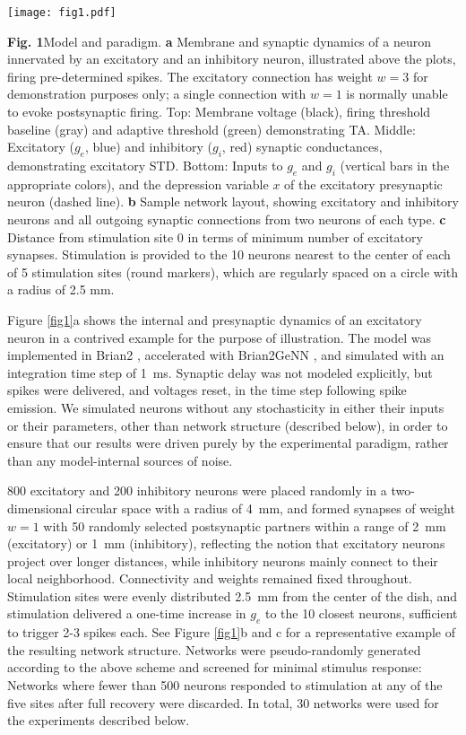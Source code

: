 \documentclass[pdflatex,referee,iicol,sn-basic]{sn-jnl}
\theoremstyle{thmstyleone}%
\theoremstyle{thmstyletwo}%
\theoremstyle{thmstylethree}%
\begin{document}
\begin{figure*}%
    \centering
    \texttt{[image: fig1.pdf]}
    \caption{}
    \label{fig1}
\end{figure*}
\textbf{Fig. 1}Model and paradigm. \textbf{a} Membrane and synaptic dynamics of a neuron innervated by an excitatory and an inhibitory neuron, illustrated above the plots, firing pre-determined spikes. The excitatory connection has weight $w = 3$ for demonstration purposes only; a single connection with $w = 1$ is normally unable to evoke postsynaptic firing. Top: Membrane voltage (black), firing threshold baseline (gray) and adaptive threshold (green) demonstrating TA. Middle: Excitatory ($g_e$, blue) and inhibitory ($g_i$, red) synaptic conductances, demonstrating excitatory STD. Bottom: Inputs to $g_e$ and $g_i$ (vertical bars in the appropriate colors), and the depression variable $x$ of the excitatory presynaptic neuron (dashed line). \textbf{b} Sample network layout, showing excitatory and inhibitory neurons and all outgoing synaptic connections from two neurons of each type. \textbf{c} Distance from stimulation site 0 in terms of minimum number of excitatory synapses. Stimulation is provided to the 10 neurons nearest to the center of each of 5 stimulation sites (round markers), which are regularly spaced on a circle with a radius of 2.5 mm.

Figure \ref{fig1}a shows the internal and presynaptic dynamics of an excitatory neuron in a contrived example for the purpose of illustration. The model was implemented in Brian2 \citep{Stimberg2019-tc}, accelerated with Brian2GeNN \citep{Stimberg2020-go}, and simulated with an integration time step of 1~ms. Synaptic delay was not modeled explicitly, but spikes were delivered, and voltages reset, in the time step following spike emission. We simulated neurons without any stochasticity in either their inputs or their parameters, other than network structure (described below), in order to ensure that our results were driven purely by the experimental paradigm, rather than any model-internal sources of noise.

800 excitatory and 200 inhibitory neurons were placed randomly in a two-dimensional circular space with a radius of 4~mm, and formed synapses of weight $w = 1$ with 50 randomly selected postsynaptic partners within a range of 2~mm (excitatory) or 1~mm (inhibitory), reflecting the notion that excitatory neurons project over longer distances, while inhibitory neurons mainly connect to their local neighborhood. Connectivity and weights remained fixed throughout. Stimulation sites were evenly distributed 2.5~mm from the center of the dish, and stimulation delivered a one-time increase in $g_e$ to the 10 closest neurons, sufficient to trigger 2-3 spikes each. See Figure \ref{fig1}b and c for a representative example of the resulting network structure. Networks were pseudo-randomly generated according to the above scheme and screened for minimal stimulus response: Networks where fewer than 500 neurons responded to stimulation at any of the five sites after full recovery were discarded. In total, 30 networks were used for the experiments described below.
\end{document}
